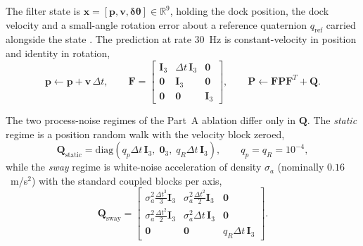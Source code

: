 The filter state is $\mathbf{x} = [\mathbf{p}, \mathbf{v}, \boldsymbol{\delta\theta}] \in \mathbb{R}^9$, holding the dock position, the dock velocity and a small-angle rotation error about a reference quaternion $q_{\mathrm{ref}}$ carried alongside the state \cite{sola2017quaternion}. The prediction at rate 30~Hz is constant-velocity in position and identity in rotation,
\begin{equation}
    \mathbf{p} \leftarrow \mathbf{p} + \mathbf{v}\,\Delta t, \qquad
    \mathbf{F} = \begin{bmatrix} \mathbf{I}_3 & \Delta t\,\mathbf{I}_3 & \mathbf{0} \\ \mathbf{0} & \mathbf{I}_3 & \mathbf{0} \\ \mathbf{0} & \mathbf{0} & \mathbf{I}_3 \end{bmatrix}, \qquad
    \mathbf{P} \leftarrow \mathbf{F}\mathbf{P}\mathbf{F}^{T} + \mathbf{Q}.
\end{equation}

The two process-noise regimes of the Part~A ablation differ only in $\mathbf{Q}$. The \emph{static} regime is a position random walk with the velocity block zeroed,
\begin{equation}
    \mathbf{Q}_{\mathrm{static}} = \mathrm{diag}\!\left(q_p \Delta t\,\mathbf{I}_3,\; \mathbf{0}_3,\; q_R \Delta t\,\mathbf{I}_3\right), \qquad q_p = q_R = 10^{-4},
\end{equation}
while the \emph{sway} regime is white-noise acceleration of density $\sigma_a$ (nominally $0.16$~m/s$^2$) with the standard coupled blocks per axis,
\begin{equation}
    \mathbf{Q}_{\mathrm{sway}} =
    \begin{bmatrix}
        \sigma_a^2 \frac{\Delta t^3}{3} \mathbf{I}_3 & \sigma_a^2 \frac{\Delta t^2}{2} \mathbf{I}_3 & \mathbf{0}                  \\
        \sigma_a^2 \frac{\Delta t^2}{2} \mathbf{I}_3 & \sigma_a^2 \Delta t\, \mathbf{I}_3           & \mathbf{0}                  \\
        \mathbf{0}                                   & \mathbf{0}                                   & q_R \Delta t\, \mathbf{I}_3
    \end{bmatrix}.
\end{equation}

